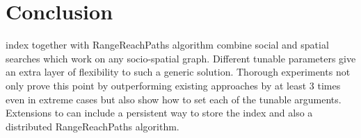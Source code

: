 \section{Conclusion} \label{sec:conclusion}
{\grp} index together with RangeReachPaths algorithm combine social and spatial searches which work on any socio-spatial graph. Different tunable parameters give an extra layer of flexibility to such a generic solution. Thorough experiments not only prove this point by outperforming existing approaches by at least 3 times even in extreme cases but also show how to set each of the tunable arguments. Extensions to {\grp} can include a persistent way to store the index and also a distributed RangeReachPaths algorithm.
